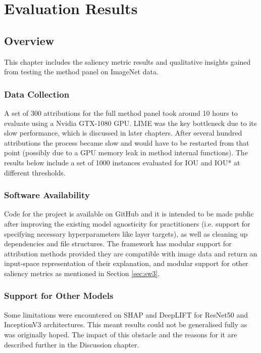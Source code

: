 \documentclass[main]{subfiles}
\begin{document}
\chapter{Evaluation Results}


\section{Overview}
This chapter includes the saliency metric results and qualitative insights gained from testing the method panel on ImageNet data.

\subsection{Data Collection}  \label{sec:data_collection}
A set of 300 attributions for the full method panel took around 10 hours to evaluate using a Nvidia GTX-1080 GPU. LIME was the key bottleneck due to its slow performance, which is discussed in later chapters. After several hundred attributions the process became slow and would have to be restarted from that point (possibly due to a GPU memory leak in method internal functions). The results below include a set of 1000 instances evaluated for IOU and IOU* at different thresholds. 

\subsection{Software Availability}

Code for the project is available on GitHub and it is intended to be made public after improving the existing model agnosticity for practitioners (i.e. support for specifying necessary hyperparameters like layer targets), as well as cleaning up dependencies and file structures. The framework has modular support for attribution methods provided they are compatible with image data and return an input-space representation of their explanation, and modular support for other saliency metrics as mentioned in Section \ref{sec:sw3}.


\subsection{Support for Other Models}

Some limitations were encountered on SHAP and DeepLIFT for ResNet50 and InceptionV3 architectures. This meant results could not be generalised fully as was originally hoped. The impact of this obstacle and the reasons for it are described further in the Discussion chapter.
\end{document}
